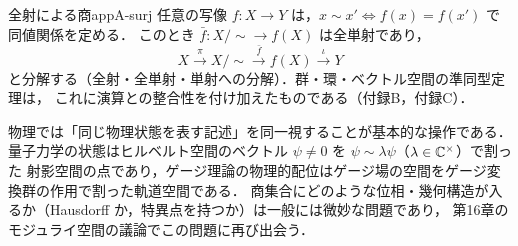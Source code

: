\begin{myex}{全射による商}{appA-surj}
任意の写像 $f\colon X\to Y$ は，$x\sim x'\iff f(x)=f(x')$ で同値関係を定める．
このとき $\bar f\colon X/{\sim}\to f(X)$ は全単射であり，
\[
X\xrightarrow{\ \pi\ }X/{\sim}\xrightarrow{\ \bar f\ }f(X)\xrightarrow{\ \iota\ }Y
\]
と分解する（全射・全単射・単射への分解）．群・環・ベクトル空間の準同型定理は，
これに演算との整合性を付け加えたものである（付録B，付録C）．
\end{myex}

\begin{physbox}[商としての物理的状態空間]
物理では「同じ物理状態を表す記述」を同一視することが基本的な操作である．
量子力学の状態はヒルベルト空間のベクトル $\psi\ne0$ を $\psi\sim\lambda\psi$（$\lambda\in\mathbb{C}^\times$）で割った
射影空間の点であり，ゲージ理論の物理的配位はゲージ場の空間をゲージ変換群の作用で割った軌道空間である．
商集合にどのような位相・幾何構造が入るか（Hausdorff か，特異点を持つか）は一般には微妙な問題であり，
第16章のモジュライ空間の議論でこの問題に再び出会う．
\end{physbox}
